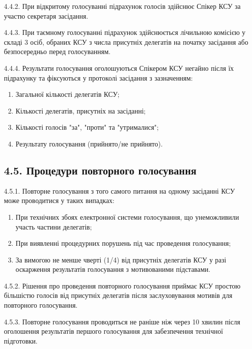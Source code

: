     4.4.2. При відкритому голосуванні підрахунок голосів здійснює Спікер КСУ за участю секретаря засідання.

    4.4.3. При таємному голосуванні підрахунок здійснюється лічильною комісією у складі 3 осіб, обраних КСУ з числа присутніх делегатів на початку засідання або безпосередньо перед голосуванням.

    4.4.4. Результати голосування оголошуються Спікером КСУ негайно після їх підрахунку та фіксуються у протоколі засідання з зазначенням:

        \begin{enumerate}[label=\alph*)]
            \item Загальної кількості делегатів КСУ;
            \item Кількості делегатів, присутніх на засіданні;
            \item Кількості голосів "за", "проти" та "утрималися";
            \item Результату голосування (прийнято/не прийнято).
        \end{enumerate}

\subsection*{4.5. Процедури повторного голосування}
    4.5.1. Повторне голосування з того самого питання на одному засіданні КСУ може проводитися у таких випадках:

        \begin{enumerate}[label=\alph*)]
            \item При технічних збоях електронної системи голосування, що унеможливили участь частини делегатів;
            \item При виявленні процедурних порушень під час проведення голосування;
            \item За вимогою не менше чверті (1/4) від присутніх делегатів КСУ у разі оскарження результатів голосування з мотивованими підставами.
        \end{enumerate}

    4.5.2. Рішення про проведення повторного голосування приймає КСУ простою більшістю голосів від присутніх делегатів після заслуховування мотивів для повторного голосування.

    4.5.3. Повторне голосування проводиться не раніше ніж через 10 хвилин після оголошення результатів першого голосування для забезпечення технічної підготовки.

